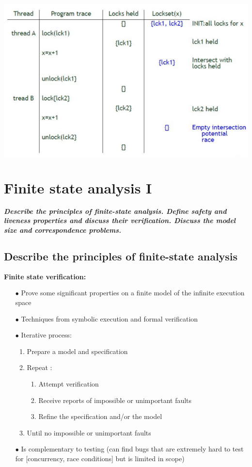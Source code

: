 \documentclass{article}
\begin{document}
\begin{center}
    \includegraphics[scale=0.55]{image/24.PNG}
\end{center}

\newpage
\section{Finite state analysis I}
\textbf{\textit{Describe the principles of finite-state analysis. Define safety and liveness properties and discuss their verification. Discuss the model size and correspondence problems.}}

\subsection{Describe the principles of finite-state analysis}
\noindent\textbf{Finite
state
verification:}
\begin{itemize}
    \item [$\bullet$]Prove some significant properties on a finite model of the infinite execution space
    \item [$\bullet$]Techniques from symbolic execution and formal verification
    \item [$\bullet$]Iterative process:
    \begin{enumerate}
        \item Prepare a model and specification
        \item Repeat :
        \begin{enumerate}
            \item Attempt verification
            \item Receive reports of impossible or unimportant faults
            \item Refine the specification and/or the model
        \end{enumerate}
        \item Until no impossible or unimportant faults

    \end{enumerate}
    \item [$\bullet$]Is complementary to testing (can find bugs that are extremely hard to test for [concurrency, race
conditions] but is limited in scope)

\end{itemize}
\end{document}
